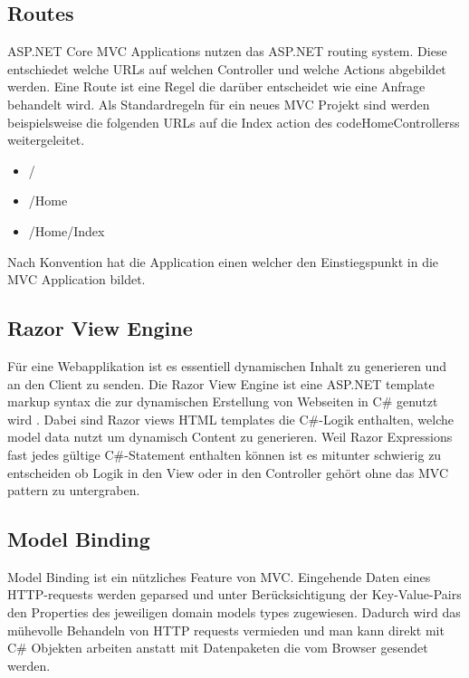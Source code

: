  
\subsection{Routes}

ASP.NET Core MVC Applications nutzen das ASP.NET routing system. Diese entschiedet welche URLs auf welchen Controller und welche Actions abgebildet werden. Eine Route ist eine Regel die darüber entscheidet wie eine Anfrage behandelt wird. Als Standardregeln für ein neues MVC Projekt sind werden beispielsweise die folgenden URLs auf die Index action des code{HomeControllers}s weitergeleitet.

\begin{itemize}

	\item /
	\item /Home
	\item /Home/Index

\end{itemize}

\noindent
Nach Konvention hat die Application einen  welcher den Einstiegspunkt in die MVC Application bildet.


\subsection{Razor View Engine}

Für eine Webapplikation ist es essentiell dynamischen Inhalt zu generieren und an den Client zu senden. Die Razor View Engine ist eine ASP.NET template markup syntax die zur dynamischen Erstellung von Webseiten in C\# genutzt wird \cite{razorengine}. Dabei sind Razor views HTML templates die C\#-Logik enthalten, welche model data nutzt um dynamisch Content zu generieren. Weil Razor Expressions fast jedes gültige C\#-Statement enthalten können ist es mitunter schwierig zu entscheiden ob Logik in den View oder in den Controller gehört ohne das MVC pattern zu untergraben.

\subsection{Model Binding}

Model Binding ist ein nützliches Feature von MVC. Eingehende Daten eines HTTP-requests werden geparsed und unter Berücksichtigung der Key-Value-Pairs den Properties des jeweiligen domain models types zugewiesen. Dadurch wird das mühevolle Behandeln von HTTP requests vermieden und man kann direkt mit C\# Objekten arbeiten anstatt mit Datenpaketen die vom Browser gesendet werden.


